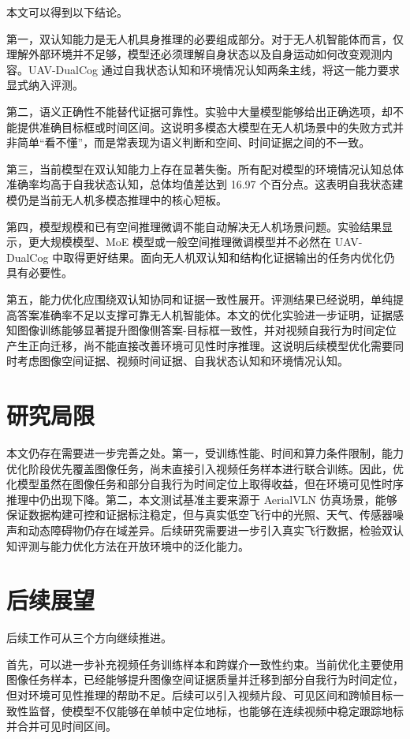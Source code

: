 本文可以得到以下结论。

第一，双认知能力是无人机具身推理的必要组成部分。对于无人机智能体而言，仅理解外部环境并不足够，模型还必须理解自身状态以及自身运动如何改变观测内容。UAV-DualCog 通过自我状态认知和环境情况认知两条主线，将这一能力要求显式纳入评测。

第二，语义正确性不能替代证据可靠性。实验中大量模型能够给出正确选项，却不能提供准确目标框或时间区间。这说明多模态大模型在无人机场景中的失败方式并非简单“看不懂”，而是常表现为语义判断和空间、时间证据之间的不一致。

第三，当前模型在双认知能力上存在显著失衡。所有配对模型的环境情况认知总体准确率均高于自我状态认知，总体均值差达到 16.97 个百分点。这表明自我状态建模仍是当前无人机多模态推理中的核心短板。

第四，模型规模和已有空间推理微调不能自动解决无人机场景问题。实验结果显示，更大规模模型、MoE 模型或一般空间推理微调模型并不必然在 UAV-DualCog 中取得更好结果。面向无人机双认知和结构化证据输出的任务内优化仍具有必要性。

第五，能力优化应围绕双认知协同和证据一致性展开。评测结果已经说明，单纯提高答案准确率不足以支撑可靠无人机智能体。本文的优化实验进一步证明，证据感知图像训练能够显著提升图像侧答案-目标框一致性，并对视频自我行为时间定位产生正向迁移，尚不能直接改善环境可见性时序推理。这说明后续模型优化需要同时考虑图像空间证据、视频时间证据、自我状态认知和环境情况认知。

\section{研究局限}

本文仍存在需要进一步完善之处。第一，受训练性能、时间和算力条件限制，能力优化阶段优先覆盖图像任务，尚未直接引入视频任务样本进行联合训练。因此，优化模型虽然在图像任务和部分自我行为时间定位上取得收益，但在环境可见性时序推理中仍出现下降。第二，本文测试基准主要来源于 AerialVLN 仿真场景，能够保证数据构建可控和证据标注稳定，但与真实低空飞行中的光照、天气、传感器噪声和动态障碍物仍存在域差异。后续研究需要进一步引入真实飞行数据，检验双认知评测与能力优化方法在开放环境中的泛化能力。

\section{后续展望}

后续工作可从三个方向继续推进。

首先，可以进一步补充视频任务训练样本和跨媒介一致性约束。当前优化主要使用图像任务样本，已经能够提升图像空间证据质量并迁移到部分自我行为时间定位，但对环境可见性推理的帮助不足。后续可以引入视频片段、可见区间和跨帧目标一致性监督，使模型不仅能够在单帧中定位地标，也能够在连续视频中稳定跟踪地标并合并可见时间区间。

